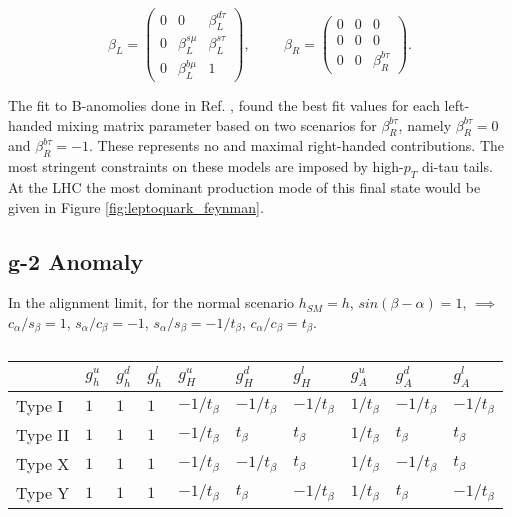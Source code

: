 \begin{equation}
\beta_{L} = 
\begin{pmatrix}
0 & 0 & \beta_{L}^{d\tau} \\
0 & \beta_{L}^{s\mu} & \beta_{L}^{s\tau} \\
0 & \beta_{L}^{b\mu} & 1
\end{pmatrix},
\hspace{1cm}
\beta_{R} = 
\begin{pmatrix}
0 & 0 & 0 \\
0 & 0 & 0 \\
0 & 0 & \beta_{R}^{b\tau}
\end{pmatrix}.
\end{equation}

The fit to B-anomolies done in Ref. \cite{leptoquark}, found the best fit values for each left-handed mixing matrix parameter based on two scenarios for $\beta^{b\tau}_{R}$, namely $\beta^{b\tau}_{R} = 0$ and $\beta^{b\tau}_{R} = -1$. These represents no and maximal right-handed contributions. The most stringent constraints on these models are imposed by high-$p_{T}$ di-tau tails. At the LHC the most dominant production mode of this final state would be given in Figure \ref{fig:leptoquark_feynman}.

\subsection{g-2 Anomaly}

In the alignment limit, for the normal scenario $h_{SM}=h$, $sin(\beta-\alpha)=1$, $\implies$ $c_{\alpha}/s_{\beta}=1$, $s_{\alpha}/c_{\beta}=-1$, $s_{\alpha}/s_{\beta}=-1/t_{\beta}$, $c_{\alpha}/c_{\beta}=t_{\beta}$.

\begin{table}[H]
    \centering
    \begin{tabular}{p{1.5cm}|x{1.2cm}x{1.2cm}x{1.2cm}x{1.2cm}x{1.2cm}x{1.2cm}x{1.2cm}x{1.2cm}x{1.2cm}}
         \hline
          & $g_{h}^{u}$ & $g_{h}^{d}$ & $g_{h}^{l}$ & $g_{H}^{u}$ & $g_{H}^{d}$ & $g_{H}^{l}$ & $g_{A}^{u}$ & $g_{A}^{d}$ & $g_{A}^{l}$ \\
         \hline
         \hline
         Type I & $1$ & $1$ & $1$ & $-1/t_{\beta}$ & $-1/t_{\beta}$ & $-1/t_{\beta}$ & $1/t_{\beta}$ & $-1/t_{\beta}$ & $-1/t_{\beta}$ \\
         Type II & $1$ & $1$ & $1$ & $-1/t_{\beta}$ & $t_{\beta}$ & $t_{\beta}$ & $1/t_{\beta}$ & $t_{\beta}$ & $t_{\beta}$ \\
         Type X & $1$ & $1$ & $1$ & $-1/t_{\beta}$ & $-1/t_{\beta}$ & $t_{\beta}$ & $1/t_{\beta}$ & $-1/t_{\beta}$ & $t_{\beta}$ \\
         Type Y & $1$ & $1$ & $1$ & $-1/t_{\beta}$ & $t_{\beta}$ & $-1/t_{\beta}$ & $1/t_{\beta}$ & $t_{\beta}$ & $-1/t_{\beta}$ \\
         \hline
    \end{tabular}
    \caption{}
\end{table}

